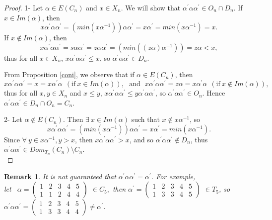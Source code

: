 \documentclass[10pt]{extarticle}
\numberwithin{equation}{section}
\numberwithin{bbb}{section}
\newtheorem{remark}{Remark}[section]
\numberwithin{equation}{section}
\begin{document}
\begin{proof}
   1- Let $\alpha \in E(C_n)$ and $x \in X_n$. We will show that $\alpha^{\prime}\alpha\alpha^{\prime} \in O_n \cap D_n$. If $x \in Im(\alpha)$, then 
   $$x \alpha^{\prime}\alpha\alpha^{\prime} =(min(x\alpha^{-1}))\alpha\alpha^{\prime}=x\alpha^{\prime}=min(x\alpha^{-1})=x.$$
   If $x \notin Im(\alpha)$, then 
   $$x \alpha^{\prime}\alpha\alpha^{\prime} =s\alpha\alpha^{\prime}=z\alpha\alpha^{\prime}=(min((z\alpha)\alpha^{-1}))=z\alpha < x,$$ thus for all $x \in X_n$, $x\alpha^{\prime}\alpha\alpha^{\prime} \leq x$, so $\alpha^{\prime}\alpha\alpha^{\prime}\in D_n$.

   \vspace{0.2cm}
   From Proposition \ref{coni}, we observe that if $\alpha \in E(C_n)$, then  $$x\alpha^{\prime}\alpha\alpha^{\prime}=x=x\alpha^{\prime}\alpha \ \ (\text{if} \ x \in Im(\alpha)),\ \ \ \text{and} \ \ \ x\alpha^{\prime}\alpha\alpha^{\prime}=z\alpha=x\alpha^{\prime}\alpha \ \ (\text{if} \ x \notin Im(\alpha)),$$ 
   thus for all $x,y \in X_n$ and $x \leq y$, $x\alpha^{\prime}\alpha\alpha^{\prime} \leq y \alpha^{\prime}\alpha\alpha^{\prime}$, so $\alpha^{\prime}\alpha\alpha^{\prime} \in O_n$. Hence $\alpha^{\prime}\alpha\alpha^{\prime} \in D_n \cap O_n=C_n$. 

\vspace{0.3cm}
  2- Let $\alpha \notin E(C_n)$. Then $\exists \ x \in Im(\alpha)$ such that $x \notin x\alpha^{-1}$,
   so 
   $$x \alpha^{\prime}\alpha\alpha^{\prime} =(min(x\alpha^{-1}))\alpha\alpha^{\prime}=x\alpha^{\prime}=min (x\alpha^{-1}).$$ Since $\forall \ y \in x\alpha^{-1}, y >x$, then $x\alpha^{\prime}\alpha\alpha^{\prime} > x$,
  and so 
$\alpha^{\prime}\alpha\alpha^{\prime} \notin D_n$, thus
  $\alpha^{\prime}\alpha\alpha^{\prime} \in Dom_{T_n}(C_n) \setminus C_n$.\\
  \end{proof}

\vspace{0.1cm}
  \begin{remark}
It is not guaranteed that $\alpha^{\prime}\alpha\alpha^{\prime}=\alpha^{\prime}$. For example,\\

\vspace{0.3cm}
let \
$\alpha=
\begin{pmatrix}  1&2&3&4&5\\1&1&2&4&4
\end{pmatrix}
$ $\in C_5,$ then
$\alpha^{\prime}=
\begin{pmatrix}  1&2&3&4&5\\1&3&3&4&5
\end{pmatrix}$ $\in T_5$,
so  
$\alpha^{\prime}\alpha\alpha^{\prime}=
\begin{pmatrix}  1&2&3&4&5\\1&3&3&4&4
\end{pmatrix}
$$\neq \alpha^{\prime}$.
\end{remark}
\end{document}
